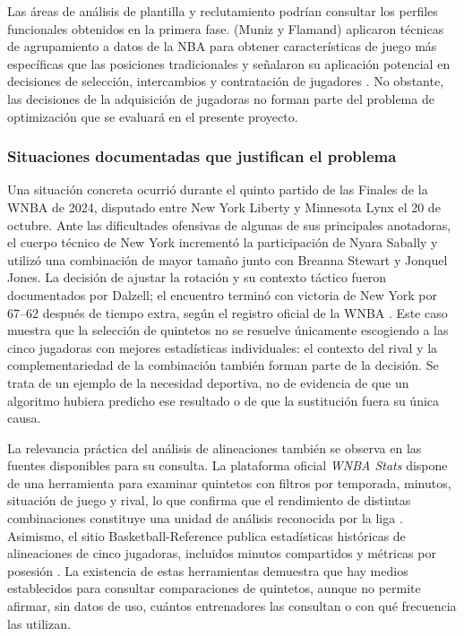 Las áreas de análisis de plantilla y reclutamiento podrían consultar los perfiles funcionales obtenidos en la primera fase. (Muniz y Flamand) aplicaron técnicas de agrupamiento a datos de la NBA para obtener características de juego más específicas que las posiciones tradicionales y señalaron su aplicación potencial en decisiones de selección, intercambios y contratación de jugadores \cite{muniz2022weightednetwork}. No obstante, las decisiones de la adquisición de jugadoras no forman parte del problema de optimización que se evaluará en el presente proyecto.

\subsubsection*{Situaciones documentadas que justifican el problema}

Una situación concreta ocurrió durante el quinto partido de las Finales de la WNBA de 2024, disputado entre New York Liberty y Minnesota Lynx el 20 de octubre. Ante las dificultades ofensivas de algunas de sus principales anotadoras, el cuerpo técnico de New York incrementó la participación de Nyara Sabally y utilizó una combinación de mayor tamaño junto con Breanna Stewart y Jonquel Jones. La decisión de ajustar la rotación y su contexto táctico fueron documentados por Dalzell; el encuentro terminó con victoria de New York por 67--62 después de tiempo extra, según el registro oficial de la WNBA \cite{dalzell2024libertyadjustment,wnba2024finalsgame5}. Este caso muestra que la selección de quintetos no se resuelve únicamente escogiendo a las cinco jugadoras con mejores estadísticas individuales: el contexto del rival y la complementariedad de la combinación también forman parte de la decisión. Se trata de un ejemplo de la necesidad deportiva, no de evidencia de que un algoritmo hubiera predicho ese resultado o de que la sustitución fuera su única causa.

La relevancia práctica del análisis de alineaciones también se observa en las fuentes disponibles para su consulta. La plataforma oficial \textit{WNBA Stats} dispone de una herramienta para examinar quintetos con filtros por temporada, minutos, situación de juego y rival, lo que confirma que el rendimiento de distintas combinaciones constituye una unidad de análisis reconocida por la liga \cite{wnbaStatsLineupsTool}. Asimismo, el sitio Basketball-Reference publica estadísticas históricas de alineaciones de cinco jugadoras, incluidos minutos compartidos y métricas por posesión \cite{basketballReferenceLiberty2024Lineups}. La existencia de estas herramientas demuestra que hay medios establecidos para consultar comparaciones de quintetos, aunque no permite afirmar, sin datos de uso, cuántos entrenadores las consultan o con qué frecuencia las utilizan.


